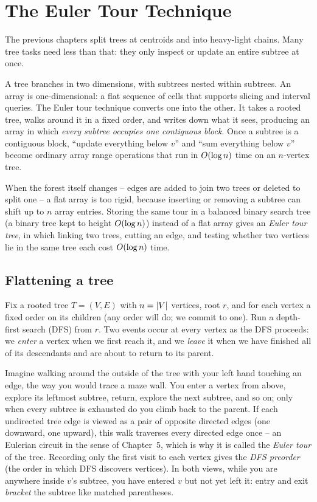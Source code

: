 \chapter{The Euler Tour Technique}

The previous chapters split trees at centroids and into heavy-light chains. Many tree tasks need less than that: they only inspect or update an entire subtree at once.

A tree branches in two dimensions, with subtrees nested within subtrees. An array is one-dimensional: a flat sequence of cells that supports slicing and interval queries. The Euler tour technique converts one into the other. It takes a rooted tree, walks around it in a fixed order, and writes down what it sees, producing an array in which \emph{every subtree occupies one contiguous block}. Once a subtree is a contiguous block, ``update everything below $v$'' and ``sum everything below $v$'' become ordinary array range operations that run in $O(\log n)$ time on an $n$-vertex tree.

When the forest itself changes -- edges are added to join two trees or deleted to split one -- a flat array is too rigid, because inserting or removing a subtree can shift up to $n$ array entries. Storing the same tour in a balanced binary search tree (a binary tree kept to height $O(\log n)$) instead of a flat array gives an \emph{Euler tour tree}, in which linking two trees, cutting an edge, and testing whether two vertices lie in the same tree each cost $O(\log n)$ time.

\chapterline

\section{Flattening a tree}
\label{ch21:flatten}

Fix a rooted tree $T=(V,E)$ with $n=\lvert V\rvert$ vertices, root $r$, and for each vertex
a fixed order on its children (any order will do; we commit to one). Run a depth-first search (DFS) from $r$. Two events occur at every vertex as the DFS proceeds: we \emph{enter}
a vertex when we first reach it, and we \emph{leave} it when we have finished all of
its descendants and are about to return to its parent.

\begin{intuitionbox}
Imagine walking around the outside of the tree with your left hand touching an
edge, the way you would trace a maze wall. You enter a vertex from above, explore
its leftmost subtree, return, explore the next subtree, and so on; only when
every subtree is exhausted do you climb back to the parent. If each undirected tree edge is viewed as a pair of opposite directed edges (one downward, one upward), this walk traverses every directed edge once -- an Eulerian circuit in the sense of Chapter~5, which is why it is called the \emph{Euler tour} of the tree. Recording only the first visit to each vertex gives the \emph{DFS preorder} (the order in which DFS discovers vertices). In both views, while you are anywhere inside $v$'s subtree, you
have entered $v$ but not yet left it: entry and exit \emph{bracket} the subtree like
matched parentheses.
\end{intuitionbox}

